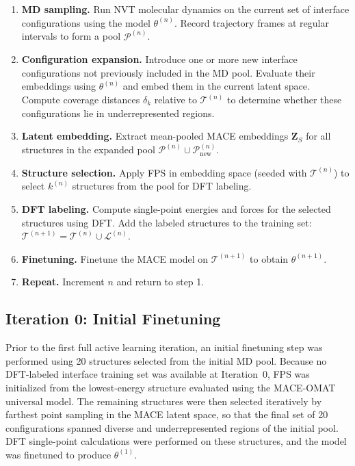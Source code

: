 \documentclass[12pt,a4paper,oneside]{book}
\begin{document}
\begin{enumerate}
    \item \textbf{MD sampling.} Run NVT molecular dynamics on the current set of
    interface configurations using the model $\theta^{(n)}$. Record trajectory
    frames at regular intervals to form a pool $\mathcal{P}^{(n)}$.

    \item \textbf{Configuration expansion.} Introduce one or more new interface
    configurations not previously included in the MD pool. Evaluate their
    embeddings using $\theta^{(n)}$ and embed them in the current latent space.
    Compute coverage distances $\delta_k$ relative to $\mathcal{T}^{(n)}$ to
    determine whether these configurations lie in underrepresented regions.

    \item \textbf{Latent embedding.} Extract mean-pooled MACE embeddings
    $\mathbf{Z}_S$ for all structures in the expanded pool
    $\mathcal{P}^{(n)} \cup \mathcal{P}^{(n)}_{\mathrm{new}}$.

    \item \textbf{Structure selection.} Apply FPS in embedding space
    (seeded with $\mathcal{T}^{(n)}$) to select $k^{(n)}$ structures
    from the pool for DFT labeling.

    \item \textbf{DFT labeling.} Compute single-point energies and forces
    for the selected structures using DFT. Add the labeled structures to
    the training set: $\mathcal{T}^{(n+1)} = \mathcal{T}^{(n)} \cup \mathcal{L}^{(n)}$.

    \item \textbf{Finetuning.} Finetune the MACE model on $\mathcal{T}^{(n+1)}$
    to obtain $\theta^{(n+1)}$.

    \item \textbf{Repeat.} Increment $n$ and return to step 1.
\end{enumerate}

\subsection{Iteration 0: Initial Finetuning}

Prior to the first full active learning iteration, an initial finetuning
step was performed using 20 structures selected from the initial MD pool.
Because no DFT-labeled interface training set was available at Iteration~0,
FPS was initialized from the lowest-energy structure evaluated using the
MACE-OMAT universal model. The remaining structures were then selected
iteratively by farthest point sampling in the MACE latent space, so that the
final set of 20 configurations spanned diverse and underrepresented regions
of the initial pool. DFT single-point calculations were performed on these
structures, and the model was finetuned to produce $\theta^{(1)}$.
\end{document}

